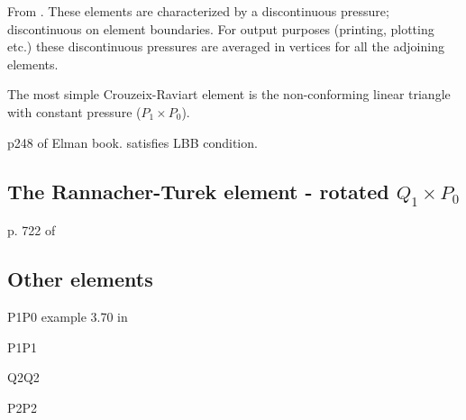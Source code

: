 From \cite{segal}. These elements are characterized by a discontinuous pressure; 
discontinuous on element boundaries. 
For output purposes (printing, plotting etc.) these discontinuous pressures are averaged 
in vertices for all the adjoining elements.

The most simple Crouzeix-Raviart element is the non-conforming linear triangle 
with constant pressure ($P_1\times P_0$).

p248 of Elman book. satisfies LBB condition. 

\subsection{The Rannacher-Turek element - rotated $Q_1\times P_0$}

p. 722 of \cite{john16}

\subsection{Other elements}

P1P0 example 3.70 in \cite{john16}

P1P1

Q2Q2

P2P2

